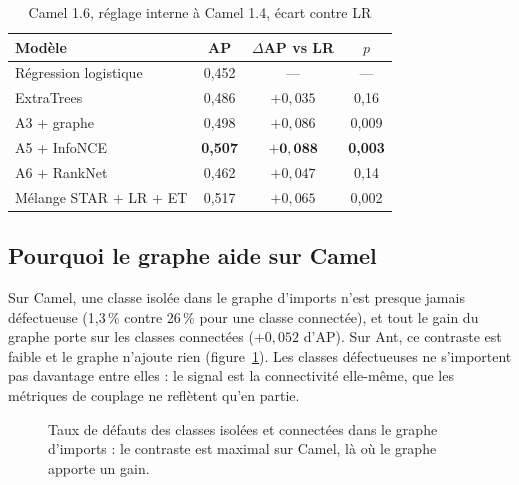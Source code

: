 \documentclass[conference,a4paper]{IEEEtran}
\newcommand{\subsect}[1]{\subsection{\textcolor{ieeeblue}{#1}}}
\begin{document}
\begin{table}[t]
\centering
\caption{Camel 1.6, réglage interne à Camel 1.4, écart contre LR}
\label{tab:camel}
\footnotesize
\begin{tabular}{@{}lccc@{}}
\toprule
Modèle & AP & $\Delta$AP vs LR & $p$ \\
\midrule
Régression logistique  & 0,452 & --- & --- \\
ExtraTrees             & 0,486 & $+0{,}035$ & 0,16 \\
A3 + graphe            & 0,498 & $+0{,}086$ & 0,009 \\
A5 + InfoNCE           & \textbf{0,507} & $\mathbf{+0{,}088}$ & \textbf{0,003} \\
A6 + RankNet           & 0,462 & $+0{,}047$ & 0,14 \\
Mélange STAR + LR + ET & 0,517 & $+0{,}065$ & 0,002 \\
\bottomrule
\end{tabular}
\end{table}

\subsect{Pourquoi le graphe aide sur Camel}
Sur Camel, une classe isolée dans le graphe d'imports n'est presque jamais défectueuse (1,3\,\% contre 26\,\% pour une
classe connectée), et tout le gain du graphe porte sur les classes connectées ($+0{,}052$ d'AP). Sur Ant, ce contraste
est faible et le graphe n'ajoute rien (figure~\ref{fig:graph}). Les classes défectueuses ne s'importent pas davantage
entre elles : le signal est la connectivité elle-même, que les métriques de couplage ne reflètent qu'en partie.

\begin{figure}[t]
\centering
{}
\caption{Taux de défauts des classes isolées et connectées dans le graphe d'imports : le contraste est maximal sur
Camel, là où le graphe apporte un gain.}
\label{fig:graph}
\end{figure}
\end{document}
